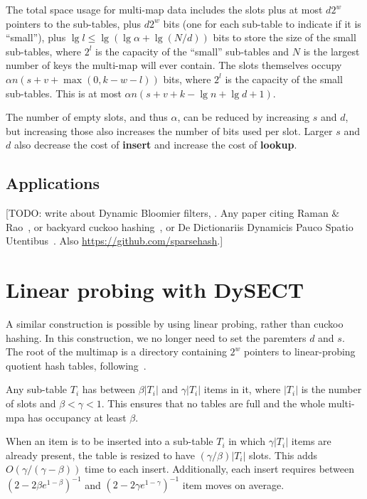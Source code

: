 \documentclass[11pt,letterpaper]{article}
\begin{document}
The total space usage for multi-map data includes the slots plus at most $d 2^w$ pointers to the sub-tables, plus $d 2^w$ bits (one for each sub-table to indicate if it is ``small''), plus $\lg l \leq \lg (\lg \alpha + \lg (N/d))$ bits to store the size of the small sub-tables, where $2^l$ is the capacity of the ``small'' sub-tables and $N$ is the largest number of keys the multi-map will ever contain.
The slots themselves occupy $\alpha n (s + v + \max(0, k - w - l))$ bits, where $2^l$ is the capacity of the small sub-tables.
This is at most $\alpha n (s + v + k - \lg n + \lg d + 1)$.

The number of empty slots, and thus $\alpha$, can be reduced by increasing $s$ and $d$, but increasing those also increases the number of bits used per slot.
Larger $s$ and $d$ also decrease the cost of {\bf insert} and increase the cost of {\bf lookup}.


\subsection{Applications}

[TODO: write about Dynamic Bloomier filters, \cite{DBLP:journals/corr/abs-cs-0502032}. Any paper citing Raman \& Rao~\cite{raman2003succinct}, or backyard cuckoo hashing~\cite{DBLP:journals/corr/abs-0912-5424}, or De Dictionariis Dynamicis Pauco Spatio Utentibus~\cite{DBLP:journals/corr/abs-cs-0512081}. Also \url{https://github.com/sparsehash}.]

\section{Linear probing with DySECT}

A similar construction is possible by using linear probing, rather than cuckoo hashing.
In this construction, we no longer need to set the paremters $d$ and $s$.
The root of the multimap is a directory containing $2^w$ pointers to linear-probing quotient hash tables, following~\cite{pandey2017general}.

Any sub-table $T_i$ has between $\beta |T_i|$ and $\gamma |T_i|$ items in it, where $|T_i|$ is the number of slots and $\beta < \gamma < 1$.
This ensures that no tables are full and the whole multi-mpa has occupancy at least $\beta$.

When an item is to be inserted into a sub-table $T_i$ in which $\gamma |T_i|$ items are already present, the table is resized to have $(\gamma / \beta) |T_i|$ slots.
This adds $O(\gamma / (\gamma - \beta))$ time to each insert.
Additionally, each insert requires between $(2 - 2\beta e^{1-\beta})^{-1}$ and $(2 - 2\gamma e^{1-\gamma})^{-1}$ item moves on average.
\end{document}
